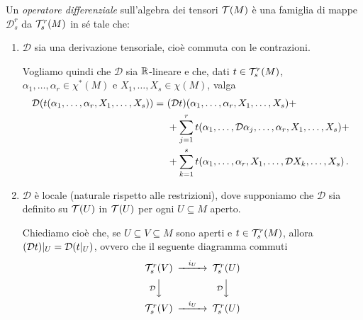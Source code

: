 \begin{definition}  \label{def:OperatoreDifferenziale}
	Un \emph{operatore differenziale} sull'algebra dei tensori $\mathcal T(M)$ è una famiglia di mappe $\mathcal D_s^r$ da $\mathcal T_s^r(M)$ in sé tale che:
	\begin{enumerate}
	 \item $\mathcal D$ sia una derivazione tensoriale, cioè commuta con le contrazioni. \label{od:Derivazione} %
	 
	 Vogliamo quindi che $\mathcal D$ sia $\mathbb R$-lineare e che, dati $t\in\mathcal T_s^r(M)$, $\alpha_1,\ldots,\alpha_r\in\chi^*(M)$ e $X_1,\ldots,X_s\in\chi(M)$, valga
	 \begin{align*}
	 	\mathcal D (t(\alpha_1,\ldots,\alpha_r,X_1,\ldots,X_s)) =\ & (\mathcal D t) (\alpha_1,\ldots,\alpha_r,X_1,\ldots,X_s) +\\
	 	&+\sum_{j=1}^r t(\alpha_1,\ldots,\mathcal D \alpha_j,\ldots, \alpha_r, X_1,\ldots, X_s) +\\
	 	&+\sum_{k=1}^s t(\alpha_1,\ldots, \alpha_r, X_1,\ldots, \mathcal D X_k,\ldots, X_s) \, \text{. }
	 \end{align*}

	\item $\mathcal D$ è locale (naturale rispetto alle restrizioni), dove supponiamo che $\mathcal D$ sia definito su $\mathcal T(U)$ in $\mathcal T(U)$ per ogni $U\subseteq M$ aperto. \label{od:Restrizioni} %
	
	Chiediamo cioè che, se $U\subseteq V \subseteq M$ sono aperti e $t\in\mathcal T_s^r(M)$, allora $(\mathcal D t)|_ U = \mathcal D (t|_ U)$, ovvero che il seguente diagramma commuti
	\begin{equation*}
	\begin{CD} 
	 \Tau_s^r(V) @>i_U>> \Tau_s^r(U) \\
	 @V\mathcal{D}VV  @V\mathcal{D}VV \\
	 \Tau_s^r(V) @>i_U>> \Tau_s^r(U) 
	\end{CD}
	\end{equation*}

	\end{enumerate}
\end{definition}

